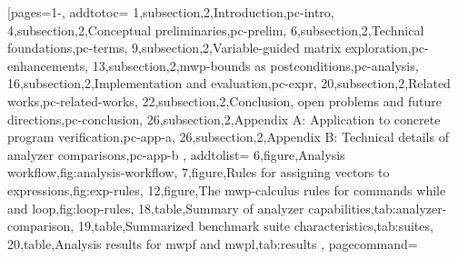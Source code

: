 \pageIconFm
{}
[pages={1-}, addtotoc={
    1,subsection,2,{Introduction},pc-intro,
    4,subsection,2,{Conceptual preliminaries},pc-prelim,
    6,subsection,2,{Technical foundations},pc-terms,
    9,subsection,2,{Variable-guided matrix exploration},pc-enhancements,
    13,subsection,2,{mwp-bounds as postconditions},pc-analysis,
    16,subsection,2,{Implementation and evaluation},pc-expr,
    20,subsection,2,{Related works},pc-related-works,
    22,subsection,2,{Conclusion, open problems and future directions},pc-conclusion,
    26,subsection,2,{Appendix A: Application to concrete program verification},pc-app-a,
    26,subsection,2,{Appendix B: Technical details of analyzer comparisons},pc-app-b
}, addtolist={
    6,figure,{Analysis workflow},fig:analysis-workflow,
    7,figure,{Rules for assigning vectors to expressions},fig:exp-rules,
    12,figure,{The mwp-calculus rules for commands while and loop},fig:loop-rules,
    18,table,{Summary of analyzer capabilities},tab:analyzer-comparison,
    19,table,{Summarized benchmark suite characteristics},tab:suites,
    20,table,{Analysis results for mwpf and mwpl},tab:results
}, pagecommand={\thispagestyle{empty}%
}
